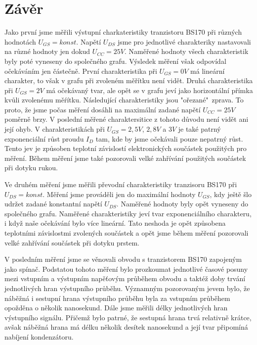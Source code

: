 \documentclass[a4paper, czech]{article}
\begin{document}
\section{Závěr}

Jako první jsme měřili výstupní charkateristiky tranzistoru BS170 při různých hodnotách $U_{GS} = konst.$
Napětí $U_{DS}$ jsme pro jednotlivé charakteriky nastavovali na různé hodnoty jen dokud $U_{CC} = 25V$.
Naměřené hodnoty všech charakteristik byly poté vyneseny do společného grafu.
Výsledek měření však odpovídal očekáváním jen částečně.
První charakteristika při $U_{GS} = 0V$ má lineární charakter, to však v grafu při zvoleném měřítku není vidět.
Druhá charakteristika při $U_{GS} = 2V$ má očekávaný tvar, ale opět se v grafu jeví jako horizontální přímka kvůli zvolenému měŕítku.
Následující charakteristiky jsou "ořezané"\ zprava.
To proto, že jsme počas měření dosáhli na maximální zadané napětí $U_{CC} = 25V$ poměrně brzy.
V poslední měřené charaktersitice z tohoto důvodu není vidět ani její ohyb.
V charakteristikách při $U_{GS} = 2,5V$, $2,8V$ a $3V$ je také patrný exponenciální růst proudu $I_D$ tam, kde by jsme očekávali pouze nepatrný růst.
Tento jev je způsoben teplotní závislostí elektronických součástek použitých pro měření.
Během měření jsme také pozorovali velké zahřívání použitých součástek při dotyku rukou.

Ve druhém měření jsme měřili převodní charakteristiky tranzisoru BS170 při $U_{DS} = konst.$
Měření jsme prováděli jen do maximální hodnoty $U_{GS}$, kdy ještě šlo udržet zadané konstantní napětí $U_{DS}$.
Naměřené hodnoty byly opět vyneseny do společného grafu.
Naměřené charakteristiky jeví tvar exponenciálního charakteru, i když naše očekávání bylo více lineární.
Tato neshoda je opět způsobena teplotními závislostmi zvolených součástek a opět jsme během měření pozorovali velké zahřívání součástek při dotyku prstem.

V posledním měření jsme se věnovali obvodu s tranzistorem BS170 zapojeným jako spínač.
Podstatou tohoto měření bylo prozkoumat jednotlivé časové posuny mezi vstupním a výstupním napěťovým průběhem obvodu a taktéž doby trvání jednotlivých hran výstupního průběhu.
Významným pozorovaným jevem bylo, že náběžná i sestupní hrana výstupního průběhu byla za vstupním průběhem opožděna o několik nanosekund.
Dále jsme měřili délky jednotlivých hran výstupního signálu. Přičemž bylo patrné, že sestupná hrana trvá relativně krátce, avšak náběžná hrana má délku několik desítek nanosekund a její tvar připomíná nabíjení kondenzátoru.
\end{document}
